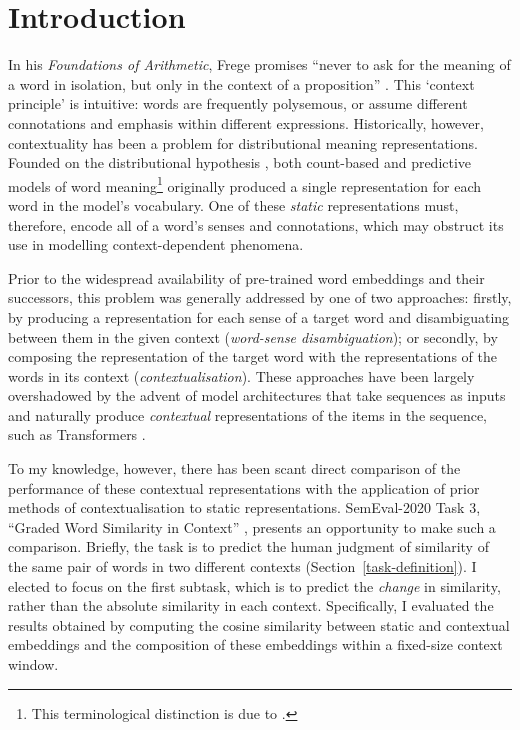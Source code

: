 
\section{Introduction}

In his \emph{Foundations of Arithmetic}, Frege promises ``never to ask for the meaning
of a word in isolation, but only in the context of a proposition''
\parencite*[xvii]{Frege1980}.
This `context principle' is intuitive: words are frequently polysemous, or assume
different connotations and emphasis within different expressions.
Historically, however, contextuality has been a problem for distributional meaning
representations.
Founded on the distributional hypothesis \parencites{Harris1954}{Firth1957}, both
count-based and predictive models of word meaning\footnote{ This terminological
  distinction is due to \textcite{Baroni2014a}.
} originally
produced a single representation for each word in the model's vocabulary.
One of these \emph{static} representations must, therefore, encode all of a word's
senses and connotations, which may obstruct its use in modelling context-dependent
phenomena.

Prior to the widespread availability of pre-trained word embeddings
\parencites[e.g.,][]{Mikolov2013}{Pennington2014} and their successors, this problem was
generally addressed by one of two approaches: firstly, by producing a representation
for each sense of a target word and disambiguating between them in the given context
(\emph{word-sense disambiguation}); or secondly, by composing the representation of the
target word with the representations of the words in its context
(\emph{contextualisation}).
These approaches have been largely overshadowed by the advent of model architectures
that take sequences as inputs and naturally produce \emph{contextual} representations
of the items in the sequence, such as Transformers \parencite{Vaswani2017}.

To my knowledge, however, there has been scant direct comparison of the performance of
these contextual representations with the application of prior methods of
contextualisation to static representations.
SemEval-2020 Task 3, ``Graded Word Similarity in Context''
\parencite{Armendariz2020a}, presents an opportunity to make such a comparison.
Briefly, the task is to predict the human judgment of similarity of the same pair of
words in two different contexts (Section~\ref{task-definition}).
I elected to focus on the first subtask, which is to predict the \emph{change} in
similarity, rather than the absolute similarity in each context.
Specifically, I evaluated the results obtained by computing the cosine similarity
between static and contextual embeddings and the composition of these embeddings within
a fixed-size context window.

